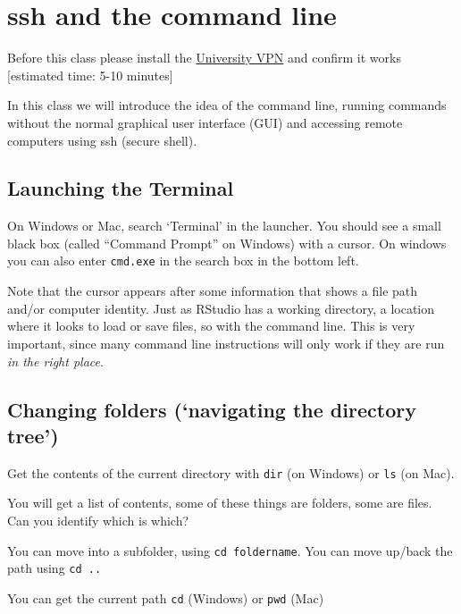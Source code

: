 \documentclass[
]{book}
\begin{document}
\hypertarget{ssh-and-the-command-line}{%
\chapter{ssh and the command line}\label{ssh-and-the-command-line}}

Before this class please install the \href{https://www.sheffield.ac.uk/it-services/vpn}{University VPN} and confirm it works {[}estimated time: 5-10 minutes{]}

In this class we will introduce the idea of the command line, running commands without the normal graphical user interface (GUI) and accessing remote computers using ssh (secure shell).

\hypertarget{launching-the-terminal}{%
\section{Launching the Terminal}\label{launching-the-terminal}}

On Windows or Mac, search `Terminal' in the launcher. You should see a small black box (called ``Command Prompt'' on Windows) with a cursor. On windows you can also enter \texttt{cmd.exe} in the search box in the bottom left.

Note that the cursor appears after some information that shows a file path and/or computer identity. Just as RStudio has a working directory, a location where it looks to load or save files, so with the command line. This is very important, since many command line instructions will only work if they are run \emph{in the right place}.

\hypertarget{changing-folders-navigating-the-directory-tree}{%
\section{Changing folders (`navigating the directory tree')}\label{changing-folders-navigating-the-directory-tree}}

Get the contents of the current directory with \texttt{dir} (on Windows) or \texttt{ls} (on Mac).

You will get a list of contents, some of these things are folders, some are files. Can you identify which is which?

You can move into a subfolder, using \texttt{cd\ foldername}. You can move up/back the path using \texttt{cd\ ..}

You can get the current path \texttt{cd} (Windows) or \texttt{pwd} (Mac)
\end{document}
